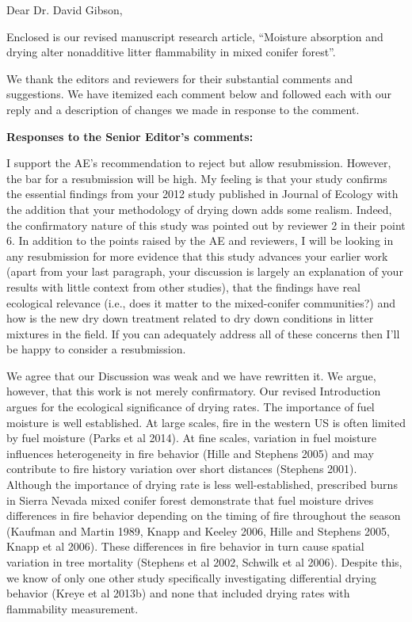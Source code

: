 \documentclass[letterpaper, 12pt]{letter}
\begin{document}
\begin{letter}{}

\opening{Dear Dr. David Gibson,}

Enclosed is our revised manuscript research article, ``Moisture absorption and drying alter nonadditive litter flammability in mixed conifer forest''.

We thank the editors and reviewers for their substantial comments and
suggestions. We have itemized each comment below and followed each with our
reply and a description of changes we made in response to the comment.

{\bf Responses to the Senior Editor's comments:}

\begin{quoting}
  I support the AE's recommendation to reject but allow resubmission. However,
  the bar for a resubmission will be high. My feeling is that your study
  confirms the essential findings from your 2012 study published in Journal of
  Ecology with the addition that your methodology of drying down adds some
  realism. Indeed, the confirmatory nature of this study was pointed out by
  reviewer 2 in their point 6. In addition to the points raised by the AE and
  reviewers, I will be looking in any resubmission for more evidence that this
  study advances your earlier work (apart from your last paragraph, your
  discussion is largely an explanation of your results with little context from
  other studies), that the findings have real ecological relevance (i.e., does
  it matter to the mixed-conifer communities?) and how is the new dry down
  treatment related to dry down conditions in litter mixtures in the field. If
  you can adequately address all of these concerns then I'll be happy to
  consider a resubmission.
\end{quoting}

We agree that our Discussion was weak and we have rewritten it. We argue,
however, that this work is not merely confirmatory. Our revised Introduction
argues for the ecological significance of drying rates. The importance of fuel
moisture is well established. At large scales, fire in the western US is often
limited by fuel moisture (Parks et al 2014). At fine scales, variation in fuel
moisture influences heterogeneity in fire behavior (Hille and Stephens 2005)
and may contribute to fire history variation over short distances (Stephens
2001). Although the importance of drying rate is less well-established,
prescribed burns in Sierra Nevada mixed conifer forest demonstrate that fuel
moisture drives differences in fire behavior depending on the timing of fire
throughout the season (Kaufman and Martin 1989, Knapp and Keeley 2006, Hille
and Stephens 2005, Knapp et al 2006). These differences in fire behavior in
turn cause spatial variation in tree mortality (Stephens et al 2002, Schwilk et
al 2006). Despite this, we know of only one other study specifically
investigating differential drying behavior (Kreye et al 2013b) and none that
included drying rates with flammability measurement.


\end{letter}
\end{document}
